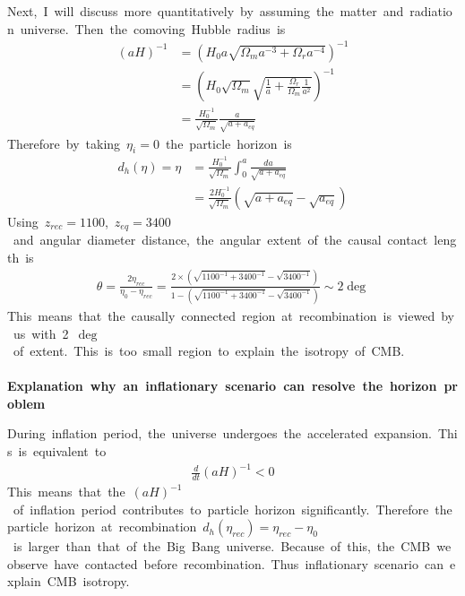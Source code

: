 Next,\ I\ will\ discuss\ more\ quantitatively\ by\ assuming\ the\ matter\ and\ radiation\ universe.\ Then\ the\ comoving\ Hubble\ radius\ is
\begin{align*}
    (aH)^{-1}&=(H_0a\sqrt{\Omega_ma^{-3}+\Omega_ra^{-4}})^{-1}\\
    &=\left(H_0\sqrt{\Omega_m}\sqrt{\frac{1}{a}+\frac{\Omega_r}{\Omega_m}\frac{1}{a^2}}\right)^{-1}\\
    &=\frac{H_0^{-1}}{\sqrt{\Omega_m}}\frac{a}{\sqrt{a+a_{eq}}}
\end{align*}
Therefore\ by\ taking\ $\eta_i=0$\ the\ particle\ horizon\ is
\begin{align*}
    d_h(\eta)=\eta&=\frac{H_0^{-1}}{\sqrt{\Omega_m}}\int^a_0\frac{da}{\sqrt{a+a_{eq}}}\\
    &=\frac{2H_0^{-1}}{\sqrt{\Omega_m}}(\sqrt{a+a_{eq}}-\sqrt{a_{eq}})
\end{align*}
Using\ $z_{rec}=1100$,\ $z_{eq}=3400$\ and\ angular\ diameter\ distance,\ the\ angular\ extent\ of\ the\ causal\ contact\ length\ is
\begin{align}
    \theta=\frac{2\eta_{rec}}{\eta_0-\eta_{rec}}=\frac{2\times(\sqrt{1100^{-1}+3400^{-1}}-\sqrt{3400^{-1}})}{1-(\sqrt{1100^{-1}+3400^{-1}}-\sqrt{3400^{-1}})}\sim2\deg
\end{align}
This\ means\ that\ the\ causally\ connected\ region\ at\ recombination\ is\ viewed\ by\ us\ with\ 2\ $\deg$\ of\ extent.\ This\ is\ too\ small\ region\ to\ explain\ the\ isotropy\ of\ CMB.\\\\
\textbf{Explanation\ why\ an\ inflationary\ scenario\ can\ resolve\ the\ horizon\ problem}

During\ inflation\ period,\ the\ universe\ undergoes\ the\ accelerated\ expansion.\ This\ is\ equivalent\ to
\begin{align*}
    \frac{d}{dt}(aH)^{-1}<0
\end{align*}
This\ means\ that\ the\ $(aH)^{-1}$\ of\ inflation\ period\ contributes\ to\ particle\ horizon\ significantly.\ Therefore\ the\ particle\ horizon\ at\ recombination\ $d_h(\eta_{rec})=\eta_{rec}-\eta_0$\ is\ larger\ than\ that\ of\ the\ Big\ Bang\ universe.\ Because\ of\ this,\ the\ CMB\ we\ observe\ have\ contacted\ before\ recombination.\ Thus\ inflationary\ scenario\ can\ explain\ CMB\ isotropy.

